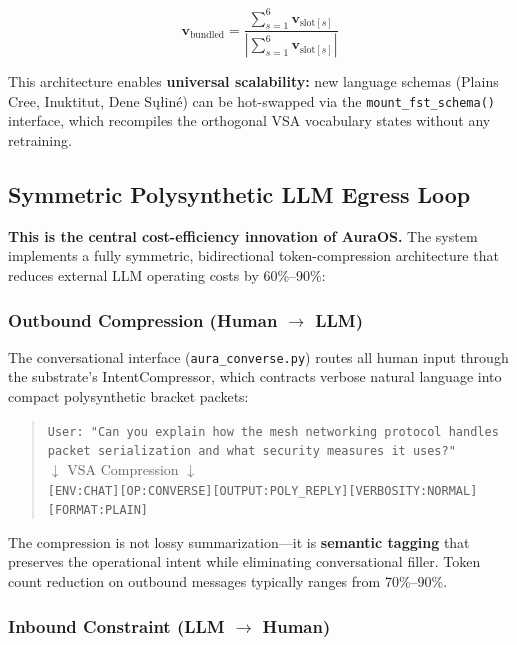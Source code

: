 \documentclass[11pt]{article}
\begin{document}
\begin{equation}
\mathbf{v}_{\text{bundled}} = \frac{\sum_{s=1}^{6} \mathbf{v}_{\text{slot}[s]}}{\left|\sum_{s=1}^{6} \mathbf{v}_{\text{slot}[s]}\right|}
\end{equation}

This architecture enables \textbf{universal scalability:} new language schemas (Plains Cree, Inuktitut, Dene Sųłiné) can be hot-swapped via the \texttt{mount\_fst\_schema()} interface, which recompiles the orthogonal VSA vocabulary states without any retraining.

\subsection{Symmetric Polysynthetic LLM Egress Loop}

\textbf{This is the central cost-efficiency innovation of AuraOS.} The system implements a fully symmetric, bidirectional token-compression architecture that reduces external LLM operating costs by 60\%--90\%:

\subsubsection{Outbound Compression (Human $\rightarrow$ LLM)}

The conversational interface (\texttt{aura\_converse.py}) routes all human input through the substrate's IntentCompressor, which contracts verbose natural language into compact polysynthetic bracket packets:

\begin{quote}
\small\texttt{User: "Can you explain how the mesh networking protocol handles packet serialization and what security measures it uses?"}
\\
$\downarrow$ VSA Compression $\downarrow$
\\
\texttt{[ENV:CHAT][OP:CONVERSE][OUTPUT:POLY\_REPLY][VERBOSITY:NORMAL][FORMAT:PLAIN]}
\end{quote}

The compression is not lossy summarization—it is \textbf{semantic tagging} that preserves the operational intent while eliminating conversational filler. Token count reduction on outbound messages typically ranges from 70\%--90\%.

\subsubsection{Inbound Constraint (LLM $\rightarrow$ Human)}
\end{document}
